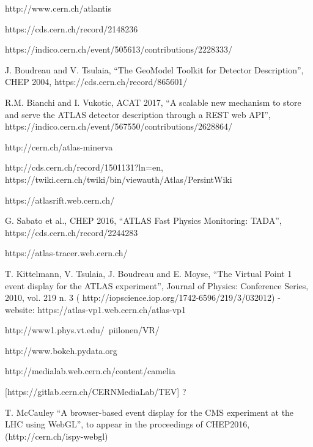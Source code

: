 \documentclass[12pt,a4paper]{article}
\begin{document}
\begin{thebibliography}{999}

 http://www.cern.ch/atlantis

 https://cds.cern.ch/record/2148236


 https://indico.cern.ch/event/505613/contributions/2228333/

 J. Boudreau and V. Tsulaia, “The GeoModel Toolkit for Detector Description”, CHEP 2004, https://cds.cern.ch/record/865601/

 R.M. Bianchi and I. Vukotic, ACAT 2017, “A scalable new mechanism to store and serve the ATLAS detector description through a REST web API”, https://indico.cern.ch/event/567550/contributions/2628864/

 http://cern.ch/atlas-minerva

 http://cds.cern.ch/record/1501131?ln=en,  https://twiki.cern.ch/twiki/bin/viewauth/Atlas/PersintWiki

 https://atlasrift.web.cern.ch/

 G. Sabato et al., CHEP 2016, “ATLAS Fast Physics Monitoring: TADA”,  https://cds.cern.ch/record/2244283

 https://atlas-tracer.web.cern.ch/

 T. Kittelmann, V. Tsulaia, J. Boudreau and E. Moyse, “The Virtual Point 1 event display for the ATLAS experiment”, Journal of Physics: Conference Series, 2010, vol. 219 n. 3 ( http://iopscience.iop.org/1742-6596/219/3/032012) - website:  https://atlas-vp1.web.cern.ch/atlas-vp1

 http://www1.phys.vt.edu/~piilonen/VR/

 http://www.bokeh.pydata.org

 http://medialab.web.cern.ch/content/camelia

 [https://gitlab.cern.ch/CERNMediaLab/TEV] ?

 T. McCauley “A browser-based event display for the CMS experiment at the LHC using WebGL”, to appear in the proceedings of CHEP2016, (http://cern.ch/ispy-webgl)


\end{thebibliography}
\end{document}
